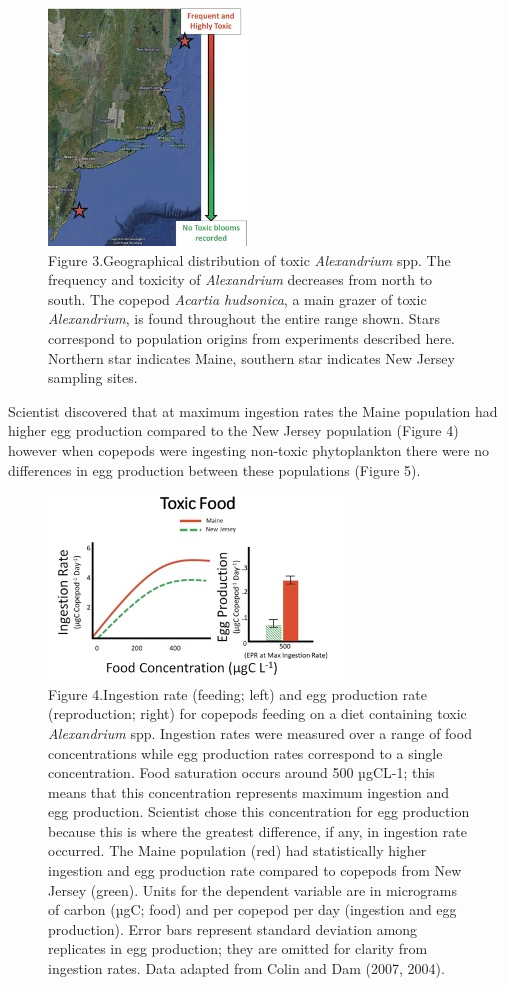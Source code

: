 \documentclass[
]{book}
\begin{document}
\begin{figure}
\centering
\includegraphics{images/figure3.png}
\caption{Figure 3.Geographical distribution of toxic \emph{Alexandrium} spp. The frequency and toxicity of \emph{Alexandrium} decreases from north to south. The copepod \emph{Acartia hudsonica}, a main grazer of toxic \emph{Alexandrium}, is found throughout the entire range shown. Stars correspond to population origins from experiments described here. Northern star indicates Maine, southern star indicates New Jersey sampling sites.}
\end{figure}

Scientist discovered that at maximum ingestion rates the Maine population had higher egg production compared to the New Jersey population (Figure 4) however when copepods were ingesting non-toxic phytoplankton there were no differences in egg production between these populations (Figure 5).

\begin{figure}
\centering
\includegraphics{images/figure4.png}
\caption{Figure 4.Ingestion rate (feeding; left) and egg production rate (reproduction; right) for copepods feeding on a diet containing toxic \emph{Alexandrium} spp. Ingestion rates were measured over a range of food concentrations while egg production rates correspond to a single concentration. Food saturation occurs around 500 µgCL-1; this means that this concentration represents maximum ingestion and egg production. Scientist chose this concentration for egg production because this is where the greatest difference, if any, in ingestion rate occurred. The Maine population (red) had statistically higher ingestion and egg production rate compared to copepods from New Jersey (green). Units for the dependent variable are in micrograms of carbon (µgC; food) and per copepod per day (ingestion and egg production). Error bars represent standard deviation among replicates in egg production; they are omitted for clarity from ingestion rates. Data adapted from Colin and Dam (2007, 2004).}
\end{figure}
\end{document}
